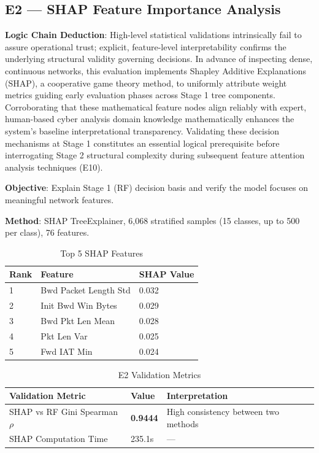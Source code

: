 \documentclass[sigconf]{acmart}
\begin{document}
\subsection{E2 --- SHAP Feature Importance Analysis}
\textbf{Logic Chain Deduction}: High-level statistical validations intrinsically fail to assure operational trust; explicit, feature-level interpretability confirms the underlying structural validity governing decisions. In advance of inspecting dense, continuous networks, this evaluation implements Shapley Additive Explanations (SHAP), a cooperative game theory method, to uniformly attribute weight metrics guiding early evaluation phases across Stage 1 tree components. Corroborating that these mathematical feature nodes align reliably with expert, human-based cyber analysis domain knowledge mathematically enhances the system's baseline interpretational transparency. Validating these decision mechanisms at Stage 1 constitutes an essential logical prerequisite before interrogating Stage 2 structural complexity during subsequent feature attention analysis techniques (E10).

\textbf{Objective}: Explain Stage 1 (RF) decision basis and verify the model focuses on meaningful network features.

\textbf{Method}: SHAP TreeExplainer, 6,068 stratified samples (15 classes, up to 500 per class), 76 features.

\begin{table}[H]
\caption{Top 5 SHAP Features}
\label{tab:shap_features}
\begin{tabular}{lll}
\toprule
\textbf{Rank} & \textbf{Feature} & \textbf{SHAP Value} \\
\midrule
1 & Bwd Packet Length Std & 0.032 \\
2 & Init Bwd Win Bytes & 0.029 \\
3 & Bwd Pkt Len Mean & 0.028 \\
4 & Pkt Len Var & 0.025 \\
5 & Fwd IAT Min & 0.024 \\
\bottomrule
\end{tabular}
\end{table}

\begin{table}[H]
\caption{E2 Validation Metrics}
\label{tab:e2_validation}
\begin{tabular}{lll}
\toprule
\textbf{Validation Metric} & \textbf{Value} & \textbf{Interpretation} \\
\midrule
SHAP vs RF Gini Spearman $\rho$ & \textbf{0.9444} & High consistency between two methods \\
SHAP Computation Time & 235.1s & --- \\
\bottomrule
\end{tabular}
\end{table}
\end{document}
